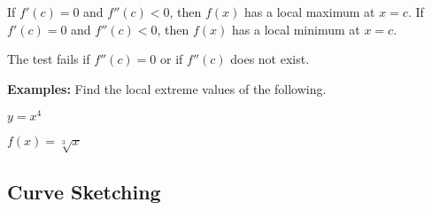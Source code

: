 \documentclass[addpoints, 12pt]{exam}
\begin{document}
\newpage


\begin{tcolorbox}[title= THE SECOND DERIVATIVE TEST,black,sharp corners,colback=white,colbacktitle=white,coltitle=black,boxrule=1pt]

    \begin{questions}
        \question If $f'(c)=0$ and $f''(c)<0$, then $f(x)$ has a local maximum at $x=c$.
        \question If $f'(c)=0$ and $f''(c)<0$, then $f(x)$ has a local minimum at $x=c$.
    \end{questions}
    
    The test fails if $f''(c)=0$ or if $f''(c)$ does not exist.
    
\end{tcolorbox}

\textbf{Examples:} Find the local extreme values of the following.
\begin{questions}
    \begin{minipage}{.45\linewidth}
        \question $y=x^4$
    \end{minipage}
    \hfill
    \begin{minipage}{.45\linewidth}
        \question $f(x)=\sqrt[3]{x}$
    \end{minipage}

\end{questions}

\subsection*{Curve Sketching}
\end{document}
